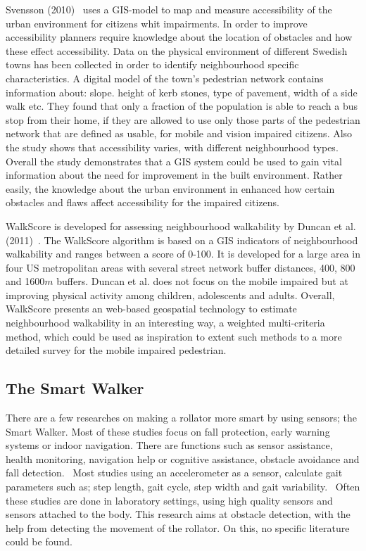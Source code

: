 Svensson (2010)~\cite{Svensson2010} uses a GIS-model to map and measure accessibility of the urban environment for citizens whit impairments. In order to improve accessibility planners require knowledge about the location of obstacles and how these effect accessibility. Data on the physical environment of different Swedish towns has been collected in order to identify neighbourhood specific characteristics. A digital model of the town's pedestrian network contains information about: slope. height of kerb stones, type of pavement, width of a side walk etc. They found that only a fraction of the population is able to reach a bus stop from their home, if they are allowed to use only those parts of the pedestrian network that are defined as usable, for mobile and vision impaired citizens. Also the study shows that accessibility varies, with different neighbourhood types.~\cite{Svensson2010} Overall the study demonstrates that a GIS system could be used to gain vital information about the need for improvement in the built environment. Rather easily, the knowledge about the urban environment in enhanced how certain obstacles and flaws affect accessibility for the impaired citizens.~\cite{Svensson2010}

WalkScore is developed for assessing neighbourhood walkability by Duncan et al.(2011)~\cite{Duncan2011}. The WalkScore algorithm is based on a GIS indicators of neighbourhood walkability and ranges between a score of 0-100. It is developed for a large area in four US metropolitan areas with several street network buffer distances, 400, 800 and 1600$m$ buffers. Duncan et al. does not focus on the mobile impaired but at improving physical activity among children, adolescents and adults. Overall, WalkScore presents an web-based geospatial technology to estimate neighbourhood walkability in an interesting way, a weighted multi-criteria method, which could be used as inspiration to extent such methods to a more detailed survey for the mobile impaired pedestrian. 

\subsection{The Smart Walker}
There are a few researches on making a rollator more smart by using sensors; the Smart Walker. Most of these studies focus on fall protection, early warning systems or indoor navigation. There are functions such as sensor assistance, health monitoring, navigation help or cognitive assistance, obstacle avoidance and fall detection.~\cite{Wang2015} Most studies using an accelerometer as a sensor, calculate gait parameters such as; step length, gait cycle, step width and gait variability.~\cite{Wang2015} Often these studies are done in laboratory settings, using high quality sensors and sensors attached to the body. This research aims at obstacle detection, with the help from detecting the movement of the rollator. On this, no specific literature could be found.

